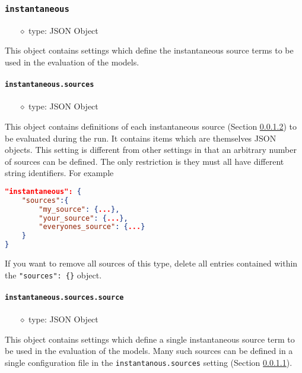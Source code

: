 \documentclass[]{article}
\def\code#1{\texttt{#1}}
\begin{document}
\subsubsection{\code{instantaneous}}
\begin{itemize}
    \item[$\diamond$] type: JSON Object 
\end{itemize}
This object contains settings which define the instantaneous source terms to be
used in the evaluation of the models.

\paragraph{\code{instantaneous.sources}}\label{sec:instsources}
\begin{itemize}
    \item[$\diamond$] type: JSON Object 
\end{itemize}
This object contains definitions of each instantaneous source (Section
\ref{sec:instsource}) to be evaluated during the run. It contains items which
are themselves JSON objects. This setting is different from other settings in
that an arbitrary number of sources can be defined. The only restriction is they
must all have different string identifiers. For example\\
\begin{lstlisting}[language=json,firstnumber=1]
"instantaneous": {
    "sources":{
        "my_source": {...},
        "your_source": {...},
        "everyones_source": {...}
    }
}
\end{lstlisting}
\medskip

\noindent If you want to remove all sources of this type, delete all entries
contained within the \code{"sources": \{\}} object.

\paragraph{\code{instantaneous.sources.source}}\label{sec:instsource}
\begin{itemize}
    \item[$\diamond$] type: JSON Object 
\end{itemize}
This object contains settings which define a single instantaneous source term to
be used in the evaluation of the models. Many such sources can be defined in a
single configuration file in the \code{instantanous.sources} setting (Section
\ref{sec:instsources}).
\end{document}
